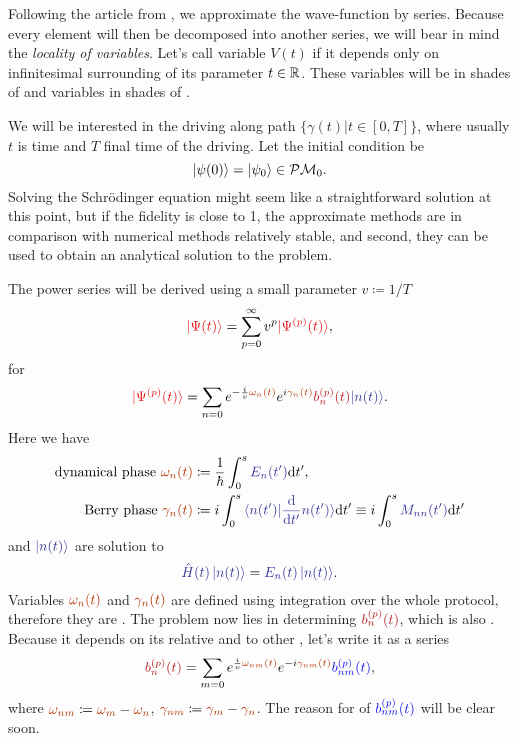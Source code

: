 Following the article from \cite{Rigolin2008}, we approximate the wave-function by series. Because every element will then be decomposed into another series, we will bear in mind the \emph{locality of variables}. Let's call variable $V(t)$ \emph{} if it depends only on infinitesimal surrounding of its parameter $t\in\mathbb{R}$. These variables will be in shades of  and  variables in shades of .

We will be interested in the driving along path $\{\gamma(t)|t\in[0,T]\}$, where usually $t$ is time and $T$ final time of the driving. Let the initial condition be
\begin{equation}
    \ket{\psi(0)}=\ket{\psi_0}\in \mathcal{P}\mathcal{M}_0.
\end{equation}
Solving the Schr\"odinger equation might seem like a straightforward solution at this point, but if the fidelity is close to 1, the approximate methods are in comparison with numerical methods relatively stable, and second, they can be used to obtain an analytical solution to the problem.

The power series will be derived using a small parameter $v\coloneqq 1/T$
\begin{equation}
    \red{\ket{\Psi(t)}}=\sum_{p=0}^\infty v^p \red{\ket{\Psi^{(p)}(t)}},
    \label{eq:mainSeries}
\end{equation}
for 
\begin{equation}
    \red{\ket{\Psi^{(p)}(t)}}=\sum_{n=0} e^{-\frac{i}{v} \reddd{\omega_n(t)}}e^{i\reddd{\gamma_n(t)}}\redd{b_n^{(p)}(t)}\bluee{\ket{n(t)}}.
\end{equation}
Here we have
\begin{align}
    \text{dynamical phase }\reddd{\omega_n(t)} &\coloneqq \frac{1}{\hbar}\int_0^s \bluee{E_n(t')}\d t',\\
    \text{Berry phase }\reddd{\gamma_n(t)} &\coloneqq i\int_0^s \bluee{\braket{n(t')|\frac{\d}{\d t'}n(t')}}\d t' \equiv i\int_0^s \bluee{M_{nn}(t')}\d t'
    \label{eq:gammadef}
\end{align}
and $\bluee{\ket{n(t)}}$ are solution to
\begin{equation}
    \bluee{\HH(t)\ket{n(t)}}=\bluee{E_n(t) \ket{n(t)}}.
\end{equation}
Variables $\reddd{\omega_n(t)}$ and $\reddd{\gamma_n(t)}$ are defined using integration over the whole protocol, therefore they are \emph{}.
The problem now lies in determining $\redd{b_n^{(p)}(t)}$, which is also . Because it depends on its relative  and  to other , let's write it as a series
\begin{equation}
    \redd{b_n^{(p)}(t)}=\sum_{m=0} e^{\frac{i}{v}\reddd{\omega_{nm}(t)}}e^{-i\reddd{\gamma_{nm}(t)}}\blue{b_{nm}^{(p)}(t)},
    \label{eq:bnAPT}
\end{equation}
where $\reddd{\omega_{nm}} \coloneqq \reddd{\omega_m}-\reddd{\omega_n}$, $\reddd{\gamma_{nm}} \coloneqq \reddd{\gamma_m}-\reddd{\gamma_n}$.  The reason for  of $\blue{b_{nm}^{(p)}(t)}$ will be clear soon.

